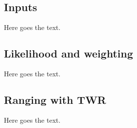 \subsection{Inputs}
Here goes the text.



\subsection{Likelihood and weighting}
Here goes the text.


\subsection{Ranging with TWR}
Here goes the text.
